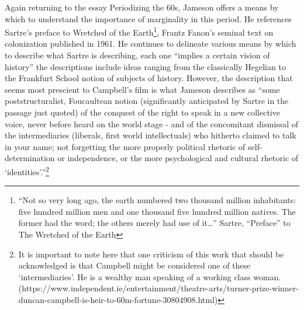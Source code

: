 \documentclass[12pt]{article}
\begin{document}
Again returning to the essay Periodizing the 60s, Jameson offers a means by which to understand the importance of marginality in this period. He references Sartre's preface to Wretched of the Earth\footnote{“Not so very long ago, the earth numbered two thousand million inhabitants: five hundred million men and one thousand five hundred million natives. The former had the word; the others merely had use of it…” Sartre, “Preface” to The Wretched of the Earth}, Frantz Fanon's seminal text on colonization published in 1961. He continues to delineate various means by which to describe what Sartre is describing, each one ``implies a certain vision of history'' the descriptions include ideas ranging from the classically Hegelian to the Frankfurt School notion of subjects of history. However, the description that seems most prescient to Campbell's film is what Jameson describes as ``some poststructuralist, Foucaultean notion (significantly anticipated by Sartre in the passage just quoted) of the conquest of the right to speak in a new collective voice, never before heard on the world stage - and of the concomitant dismissal of the intermediaries (liberals, first world intellectuals) who hitherto claimed to talk in your name; not forgetting the more properly political rhetoric of self-determination or independence, or the more psychological and cultural rhetoric of `identities'.''\footnote{It is important to note here that one criticism of this work that should be acknowledged is that Campbell might be considered one of these ‘intermediaries’. He is a wealthy man speaking of a working class woman.(https://www.independent.ie/entertainment/theatre-arts/turner-prize-winner-duncan-campbell-is-heir-to-60m-fortune-30804908.html)} 
\end{document}

